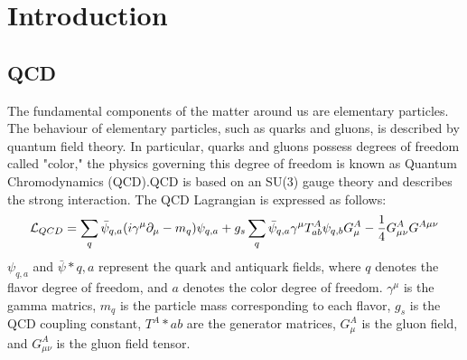\section{Introduction}
    \subsection{QCD}
    \label{Intro:QCD}
        The fundamental components of the matter around us are elementary particles. The behaviour of elementary particles, such as quarks and gluons, is described by quantum field theory. In particular, quarks and gluons possess degrees of freedom called "color," the physics governing this degree of freedom is known as Quantum Chromodynamics (QCD).\@ QCD is based on an SU(3) gauge theory and describes the strong interaction. The QCD Lagrangian is expressed as follows:
        \begin{eqnarray}
            \label{QCDlagrangian}
            \mathcal{L}_{QCD}=\sum_q \bar{\psi}_{q,a}\qty(i\gamma^\mu\partial_\mu-m_q)\psi_{q,a}+g_s \sum_q \bar{\psi}_{q,a}\gamma^\mu T^A_{ab}\psi_{q,b}G^A_\mu-\frac{1}{4}G^A_{\mu\nu}G^{A\mu\nu}
        \end{eqnarray}
        $\psi_{q,a}$ and $\bar{\psi}*{q,a}$ represent the quark and antiquark fields, where $q$ denotes the flavor degree of freedom, and $a$ denotes the color degree of freedom. $\gamma^\mu$ is the gamma matrics, $m_q$ is the particle mass corresponding to each flavor, $g_s$ is the QCD coupling constant, $T^A*{ab}$ are the generator matrices, $G^A_\mu$ is the gluon field, and $G^A_{\mu\nu}$ is the gluon field tensor.

